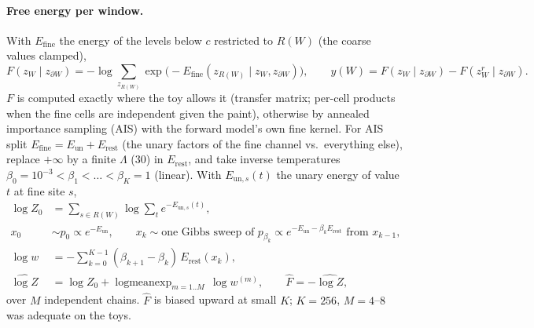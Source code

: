 \documentclass[11pt]{article}
\newcommand{\1}{\mathds{1}}
\DeclareMathOperator{\logmeanexp}{logmeanexp}
\begin{document}
\paragraph{Free energy per window.} With $E_{\mathrm{fine}}$ the energy of the levels below
$c$ restricted to $R(W)$ (the coarse values clamped),
\begin{equation}
  F(z_W \mid z_{\partial W}) = -\log \sum_{z_{R(W)}} \exp\big(-E_{\mathrm{fine}}(z_{R(W)} \mid z_W, z_{\partial W})\big),
  \qquad
  y(W) = F(z_W \mid z_{\partial W}) - F(z^{r}_W \mid z_{\partial W}).
\end{equation}
$F$ is computed exactly where the toy allows it (transfer matrix; per-cell products when the fine
cells are independent given the paint), otherwise by annealed importance sampling (AIS) with the
forward model's own fine kernel. For AIS split $E_{\mathrm{fine}} = E_{\mathrm{un}} +
E_{\mathrm{rest}}$ (the unary factors of the fine channel vs.\ everything else), replace
$+\infty$ by a finite $\Lambda$ ($30$) in $E_{\mathrm{rest}}$, and take inverse temperatures
$\beta_0 = 10^{-3} < \beta_1 < \dots < \beta_K = 1$ (linear). With $E_{\mathrm{un}, s}(t)$ the
unary energy of value $t$ at fine site $s$,
\begin{align}
  \log Z_0 &= \sum_{s \in R(W)} \log \sum_{t} e^{-E_{\mathrm{un}, s}(t)}, \\
  x_0 &\sim p_0 \propto e^{-E_{\mathrm{un}}}, \qquad
  x_k \sim \text{one Gibbs sweep of } p_{\beta_k} \propto e^{-E_{\mathrm{un}} - \beta_k E_{\mathrm{rest}}} \text{ from } x_{k-1}, \\
  \log w &= -\sum_{k=0}^{K-1} (\beta_{k+1} - \beta_k)\, E_{\mathrm{rest}}(x_k), \\
  \widehat{\log Z} &= \log Z_0 + \logmeanexp_{m = 1..M}\, \log w^{(m)}, \qquad \hat F = -\widehat{\log Z},
\end{align}
over $M$ independent chains. $\hat F$ is biased upward at small $K$; $K = 256$, $M = 4$--$8$ was
adequate on the toys.
\end{document}
